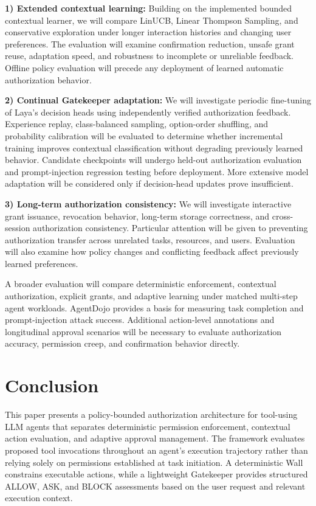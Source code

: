 \documentclass[10pt,conference]{IEEEtran}
\begin{document}
\textbf{1) Extended contextual learning:}
Building on the implemented bounded contextual
learner, we will compare LinUCB, Linear
Thompson Sampling, and conservative exploration
under longer interaction histories and
changing user preferences. The evaluation will
examine confirmation reduction, unsafe grant
reuse, adaptation speed, and robustness to
incomplete or unreliable feedback. Offline
policy evaluation will precede any deployment
of learned automatic authorization behavior.

\textbf{2) Continual Gatekeeper adaptation:}
We will investigate periodic fine-tuning of Laya's decision heads using independently verified authorization feedback. Experience replay, class-balanced sampling, option-order shuffling, and probability calibration will be evaluated to determine whether incremental training improves contextual classification without degrading previously learned behavior. Candidate checkpoints will undergo held-out authorization evaluation and prompt-injection regression testing before deployment. More extensive model adaptation will be considered only if decision-head updates prove insufficient.

\textbf{3) Long-term authorization consistency:}
We will investigate interactive grant issuance,
revocation behavior, long-term storage correctness,
and cross-session authorization consistency.
Particular attention will be given to preventing
authorization transfer across unrelated tasks,
resources, and users. Evaluation will also
examine how policy changes and conflicting
feedback affect previously learned preferences.

A broader evaluation will compare deterministic enforcement, contextual authorization, explicit grants, and adaptive learning under matched multi-step agent workloads. AgentDojo \cite{debenedetti2024agentdojo} provides a basis for measuring task completion and prompt-injection attack success. Additional action-level annotations and longitudinal approval scenarios will be necessary to evaluate authorization accuracy, permission creep, and confirmation behavior directly.



\section{Conclusion}

This paper presents a policy-bounded authorization architecture for tool-using LLM agents that separates deterministic permission enforcement, contextual action evaluation, and adaptive approval management. The framework evaluates proposed tool invocations throughout an agent's execution trajectory rather than relying solely on permissions established at task initiation. A deterministic Wall constrains executable actions, while a lightweight Gatekeeper provides structured ALLOW, ASK, and BLOCK assessments based on the user request and relevant execution context.
\end{document}
